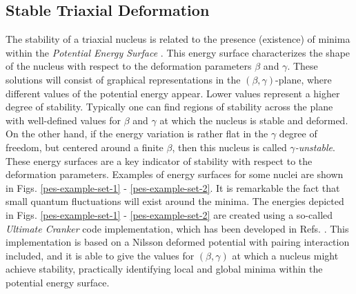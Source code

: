 \subsection{Stable Triaxial Deformation}
\label{subsection-potential-energy-surfaces}

The stability of a triaxial nucleus is related to the presence (existence) of minima within the \emph{Potential Energy Surface} \cite{ring2004nuclear}. This energy surface characterizes the shape of the nucleus with respect to the deformation parameters $\beta$ and $\gamma$. 
These solutions will consist of graphical representations in the $(\beta,\gamma)$-plane, where different values of the potential energy appear. Lower values represent a higher degree of stability. Typically one can find regions of stability across the plane with well-defined values for $\beta$ and $\gamma$ at which the nucleus is stable and deformed. On the other hand, if the energy variation is rather flat in the $\gamma$ degree of freedom, but centered around a finite $\beta$, then this nucleus is called \emph{$\gamma$-unstable}. These energy surfaces are a key indicator of stability with respect to the deformation parameters. Examples of energy surfaces for some nuclei are shown in Figs. \ref{pes-example-set-1} - \ref{pes-example-set-2}. It is remarkable the fact that small quantum fluctuations will exist around the minima. The energies depicted in Figs. \ref{pes-example-set-1} - \ref{pes-example-set-2} are created using a so-called \emph{Ultimate Cranker} code implementation, which has been developed in Refs. \cite{bengtsson1989method,bengtsson1990high}. This implementation is based on a Nilsson deformed potential with pairing interaction included, and it is able to give the values for $(\beta,\gamma)$ at which a nucleus might achieve stability, practically identifying local and global minima within the potential energy surface.
